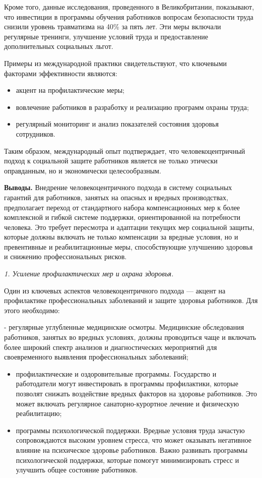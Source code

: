 \begin{multicols}{2}
Кроме того, данные исследования, проведенного в Великобритании,
показывают, что инвестиции в программы обучения работников вопросам
безопасности труда снизили уровень травматизма на 40\% за пять лет. Эти
меры включали регулярные тренинги, улучшение условий труда и
предоставление дополнительных социальных льгот\hspace{0pt}.

Примеры из международной практики свидетельствуют, что ключевыми
факторами эффективности являются:

\begin{itemize}
\item
  акцент на профилактические меры;
\item
  вовлечение работников в разработку и реализацию программ охраны труда;
\item
  регулярный мониторинг и анализ показателей состояния здоровья
  сотрудников.
\end{itemize}

Таким образом, международный опыт подтверждает, что человекоцентричный
подход к социальной защите работников является не только этически
оправданным, но и экономически целесообразным.

{\bfseries Выводы.} Внедрение человекоцентричного подхода в систему
социальных гарантий для работников, занятых на опасных и вредных
производствах, предполагает переход от стандартного набора
компенсационных мер к более комплексной и гибкой системе поддержки,
ориентированной на потребности человека. Это требует пересмотра и
адаптации текущих мер социальной защиты, которые должны включать не
только компенсации за вредные условия, но и превентивные и
реабилитационные меры, способствующие улучшению здоровья и снижению
профессиональных рисков.

\emph{1. Усиление профилактических мер и охрана здоровья.}

Один из ключевых аспектов человекоцентричного подхода --- акцент на
профилактике профессиональных заболеваний и защите здоровья работников.
Для этого необходимо:

- регулярные углубленные медицинские осмотры. Медицинские обследования
работников, занятых во вредных условиях, должны проводиться чаще и
включать более широкий спектр анализов и диагностических мероприятий для
своевременного выявления профессиональных заболеваний;

\begin{itemize}
\item
  профилактические и оздоровительные программы. Государство и
  работодатели могут инвестировать в программы профилактики, которые
  позволят снижать воздействие вредных факторов на здоровье работников.
  Это может включать регулярное санаторно-курортное лечение и физическую
  реабилитацию;
\item
  программы психологической поддержки. Вредные условия труда зачастую
  сопровождаются высоким уровнем стресса, что может оказывать негативное
  влияние на психическое здоровье работников. Важно развивать программы
  психологической поддержки, которые помогут минимизировать стресс и
  улучшить общее состояние работников.
\end{itemize}


\end{multicols}
